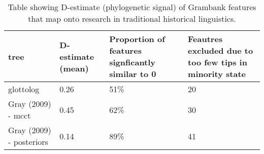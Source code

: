 \begin{table}[ht]
\centering
\begin{tabular}{p{5cm}p{3cm}p{3.5cm}p{3.5cm}}
  \hline
tree & D-estimate (mean) & Proportion of features signficantly similar to 0 & Feautres excluded due to too few tips in minority state \\ 
  \hline
glottolog & 0.26 & 51\% &  20 \\ 
  Gray (2009) - mcct & 0.45 & 62\% &  30 \\ 
  Gray (2009) - posteriors & 0.14 & 89\% &  41 \\ 
   \hline
\end{tabular}
\caption{Table showing D-estimate (phylogenetic signal) of Grambank features that map onto research in traditional historical linguistics.} 
\label{d_estimate_summary}
\end{table}
